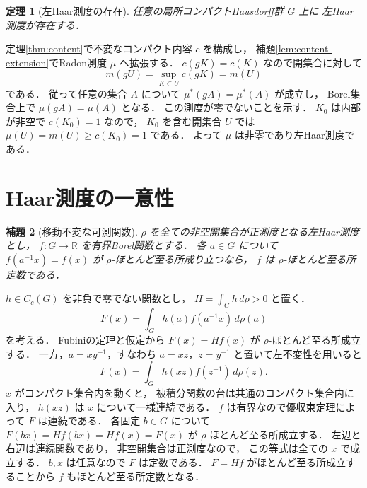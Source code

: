 \documentclass[a5paper,10pt,onecolumn]{jsarticle}
\makeatletter
\theoremstyle{mathnotetheorem}
\newtheorem{theorem}{定理}[section]
\newtheorem{lemma}[theorem]{補題}
\renewcommand{\proofname}{証明}
\renewenvironment{proof}[1][\proofname]{%
  \par\pushQED{\qed}\normalfont\topsep4\p@\@plus2\p@\relax
  \trivlist\item[\hskip\labelsep\bfseries #1]\ignorespaces
}{\popQED\endtrivlist\@endpefalse}
\makeatother
\begin{document}
\begin{theorem}[左Haar測度の存在]\label{thm:haar-exists}
任意の局所コンパクトHausdorff群 $G$ 上に
左Haar測度が存在する．
\end{theorem}
\begin{proof}
定理\ref{thm:content}で不変なコンパクト内容 $c$ を構成し，
補題\ref{lem:content-extension}でRadon測度 $\mu$ へ拡張する．
$c(gK)=c(K)$ なので開集合に対して
\[
 m(gU)=\sup_{K\subset U}c(gK)=m(U)
\]
である．
従って任意の集合 $A$ について
$\mu^*(gA)=\mu^*(A)$ が成立し，
Borel集合上で $\mu(gA)=\mu(A)$ となる．
この測度が零でないことを示す．
$K_0$ は内部が非空で $c(K_0)=1$ なので，
$K_0$ を含む開集合 $U$ では
$\mu(U)=m(U)\ge c(K_0)=1$ である．
よって $\mu$ は非零であり左Haar測度である．
\end{proof}

\section{Haar測度の一意性}

\begin{lemma}[移動不変な可測関数]\label{lem:ergodic}
$\rho$ を全ての非空開集合が正測度となる左Haar測度とし，
$f:G\to\mathbb R$ を有界Borel関数とする．
各 $a\in G$ について
$f(a^{-1}x)=f(x)$ が $\rho$-ほとんど至る所成り立つなら，
$f$ は $\rho$-ほとんど至る所定数である．
\end{lemma}
\begin{proof}
$h\in C_c(G)$ を非負で零でない関数とし，
$H=\int_Gh\,d\rho>0$ と置く．
\[
 F(x)=\int_G h(a)f(a^{-1}x)\,d\rho(a)
\]
を考える．
Fubiniの定理と仮定から
$F(x)=Hf(x)$ が $\rho$-ほとんど至る所成立する．
一方，$a=xy^{-1}$，すなわち
$a=xz$，$z=y^{-1}$ と置いて左不変性を用いると
\[
 F(x)=\int_Gh(xz)f(z^{-1})\,d\rho(z).
\]
$x$ がコンパクト集合内を動くと，
被積分関数の台は共通のコンパクト集合内に入り，
$h(xz)$ は $x$ について一様連続である．
$f$ は有界なので優収束定理によって
$F$ は連続である．
各固定 $b\in G$ について
$F(bx)=Hf(bx)=Hf(x)=F(x)$ が
$\rho$-ほとんど至る所成立する．
左辺と右辺は連続関数であり，
非空開集合は正測度なので，
この等式は全ての $x$ で成立する．
$b,x$ は任意なので $F$ は定数である．
$F=Hf$ がほとんど至る所成立することから
$f$ もほとんど至る所定数となる．
\end{proof}
\end{document}
